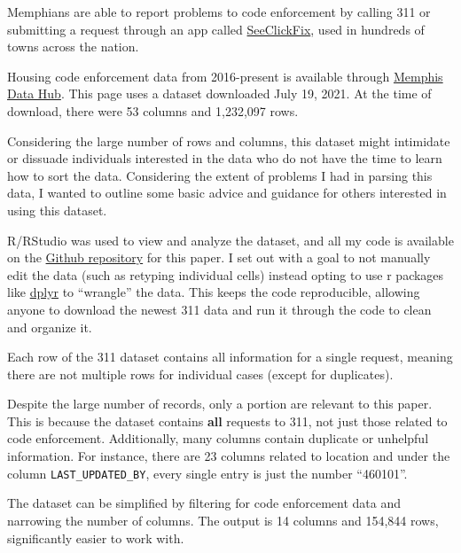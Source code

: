\documentclass[
]{book}
\begin{document}
Memphians are able to report problems to code enforcement by calling 311 or submitting a request through an app called \href{https://seeclickfix.com/}{SeeClickFix}, used in hundreds of towns across the nation.

Housing code enforcement data from 2016-present is available through \href{https://data.memphistn.gov/dataset/Service-Requests-since-2016/hmd4-ddta}{Memphis Data Hub}. This page uses a dataset downloaded July 19, 2021. At the time of download, there were 53 columns and 1,232,097 rows.

Considering the large number of rows and columns, this dataset might intimidate or dissuade individuals interested in the data who do not have the time to learn how to sort the data. Considering the extent of problems I had in parsing this data, I wanted to outline some basic advice and guidance for others interested in using this dataset.

R/RStudio was used to view and analyze the dataset, and all my code is available on the \href{https://github.com/sj-io/MA-capstone}{Github repository} for this paper. I set out with a goal to not manually edit the data (such as retyping individual cells) instead opting to use r packages like \href{https://dplyr.tidyverse.org/}{dplyr} to ``wrangle'' the data. This keeps the code reproducible, allowing anyone to download the newest 311 data and run it through the code to clean and organize it.

Each row of the 311 dataset contains all information for a single request, meaning there are not multiple rows for individual cases (except for duplicates).

Despite the large number of records, only a portion are relevant to this paper. This is because the dataset contains \textbf{all} requests to 311, not just those related to code enforcement. Additionally, many columns contain duplicate or unhelpful information. For instance, there are 23 columns related to location and under the column \texttt{LAST\_UPDATED\_BY}, every single entry is just the number ``460101''.

The dataset can be simplified by filtering for code enforcement data and narrowing the number of columns. The output is 14 columns and 154,844 rows, significantly easier to work with.
\end{document}
